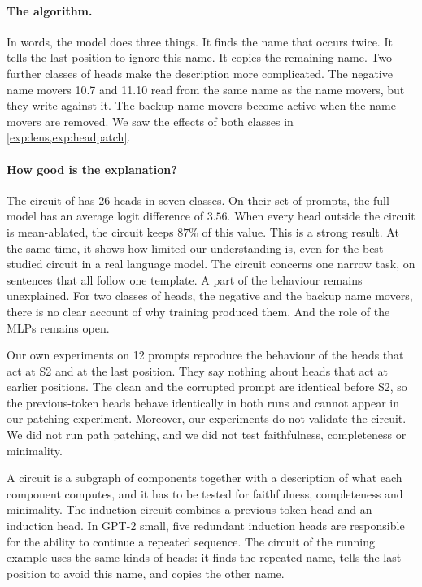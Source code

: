 \paragraph{The algorithm.} In words, the model does three things. It finds the name that occurs twice. It tells
the last position to ignore this name. It copies the remaining name. Two further classes of heads make the description
more complicated. The negative name movers 10.7 and 11.10 read from the same name as the name movers, but they write
against it. The backup name movers become active when the name movers are removed. We saw the effects of both
classes in \cref{exp:lens,exp:headpatch}.

\paragraph{How good is the explanation?} The circuit of \citet{wang2023interpretability} has 26 heads in seven
classes. On their set of prompts, the full model has an average logit difference of $3.56$. When every head outside
the circuit is mean-ablated, the circuit keeps $87\%$ of this value. This is a strong result. At the same time, it
shows how limited our understanding is, even for the best-studied circuit in a real language model. The circuit
concerns one narrow task, on sentences that all follow one template. A part of the behaviour remains unexplained.
For two classes of heads, the negative and the backup name movers, there is no clear account of why training
produced them. And the role of the MLPs remains open.

\begin{caution}
Our own experiments on 12 prompts reproduce the behaviour of the heads that act at S2 and at the last position.
They say nothing about heads that act at earlier positions. The clean and the corrupted prompt are identical before
S2, so the previous-token heads behave identically in both runs and cannot appear in our patching experiment.
Moreover, our experiments do not validate the circuit. We did not run path patching, and we did not test
faithfulness, completeness or minimality.
\end{caution}

\begin{takeaways}
A circuit is a subgraph of components together with a description of what each component computes, and it has
to be tested for faithfulness, completeness and minimality. The induction circuit combines a previous-token head
and an induction head. In GPT-2 small, five redundant induction heads are responsible for the ability to continue a
repeated sequence. The circuit of the running example uses the same kinds of heads: it finds the repeated name,
tells the last position to avoid this name, and copies the other name.
\end{takeaways}

